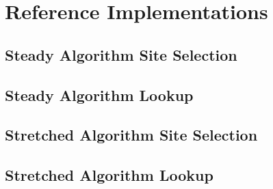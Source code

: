 \section{Reference Implementations}

\subsection{Steady Algorithm Site Selection}





\subsection{Steady Algorithm Lookup}





\subsection{Stretched Algorithm Site Selection}





\subsection{Stretched Algorithm Lookup}



